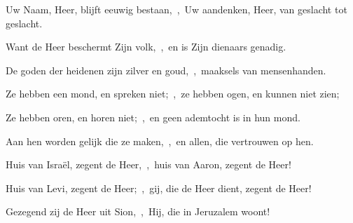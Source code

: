 \documentclass[12pt,twoside,a5paper]{article}
\begin{document}
\begin{halfparskip}
  Uw Naam, Heer, blijft eeuwig bestaan,~\sep\ Uw aandenken, Heer, van geslacht tot geslacht.

  Want de Heer beschermt Zijn volk,~\sep\ en is Zijn dienaars genadig.

  De goden der heidenen zijn zilver en goud,~\sep\ maaksels van mensenhanden.

  Ze hebben een mond, en spreken niet;~\sep\ ze hebben ogen, en kunnen niet zien;

  Ze hebben oren, en horen niet;~\sep\ en geen ademtocht is in hun mond.

  Aan hen worden gelijk die ze maken,~\sep\ en allen, die vertrouwen op hen.

  Huis van Israël, zegent de Heer,~\sep\ huis van Aaron, zegent de Heer!

  Huis van Levi, zegent de Heer;~\sep\ gij, die de Heer dient, zegent de Heer!

  Gezegend zij de Heer uit Sion,~\sep\ Hij, die in Jeruzalem woont!
\end{halfparskip}
\end{document}
